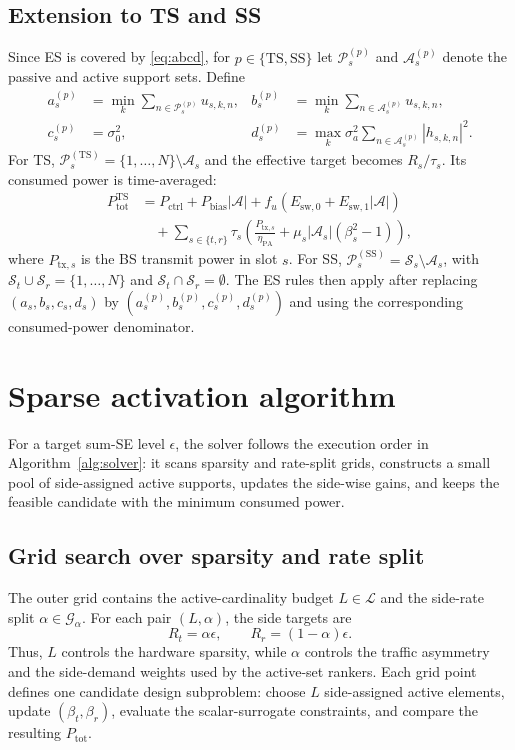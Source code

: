 \documentclass[journal]{IEEEtran}
\begin{document}
\subsection{Extension to TS and SS}
Since ES is covered by \eqref{eq:abcd}, for $p\in\{\mathrm{TS},\mathrm{SS}\}$ let $\mathcal{P}_s^{(p)}$ and $\mathcal{A}_s^{(p)}$ denote the passive and active support sets. Define
\begin{align*}
a_s^{(p)} &= \min_k \sum_{n\in\mathcal{P}_s^{(p)}} u_{s,k,n}, &
 b_s^{(p)} &= \min_k \sum_{n\in\mathcal{A}_s^{(p)}} u_{s,k,n},\\
c_s^{(p)} &= \sigma_0^2, &
d_s^{(p)} &= \max_k \sigma_a^2 \sum_{n\in\mathcal{A}_s^{(p)}} |h_{s,k,n}|^2.
\end{align*}
For TS, $\mathcal{P}_s^{(\mathrm{TS})}=\{1,\ldots,N\}\setminus\mathcal{A}_s$ and the effective target becomes $R_s/\tau_s$. Its consumed power is time-averaged:
\begin{equation}
\begin{aligned}
P_{\mathrm{tot}}^{\mathrm{TS}}
&=P_{\mathrm{ctrl}}+P_{\mathrm{bias}}|\mathcal{A}|
+f_u\!\left(E_{\mathrm{sw},0}+E_{\mathrm{sw},1}|\mathcal{A}|\right) \\
&\quad +\sum_{s\in\{t,r\}}\tau_s\!\left(\frac{P_{\mathrm{tx},s}}{\eta_{\mathrm{PA}}}
+\mu_s|\mathcal{A}_s|(\beta_s^2-1)\right),
\end{aligned}
\label{eq:ts_power}
\end{equation}
where $P_{\mathrm{tx},s}$ is the BS transmit power in slot $s$. For SS, $\mathcal{P}_s^{(\mathrm{SS})}=\mathcal{S}_s\setminus\mathcal{A}_s$, with $\mathcal{S}_t\cup\mathcal{S}_r=\{1,\ldots,N\}$ and $\mathcal{S}_t\cap\mathcal{S}_r=\emptyset$. The ES rules then apply after replacing $(a_s,b_s,c_s,d_s)$ by $(a_s^{(p)},b_s^{(p)},c_s^{(p)},d_s^{(p)})$ and using the corresponding consumed-power denominator.

\section{Sparse activation algorithm}
For a target sum-SE level $\epsilon$, the solver follows the execution order in Algorithm~\ref{alg:solver}: it scans sparsity and rate-split grids, constructs a small pool of side-assigned active supports, updates the side-wise gains, and keeps the feasible candidate with the minimum consumed power.

\subsection{Grid search over sparsity and rate split}
The outer grid contains the active-cardinality budget $L\in\mathcal{L}$ and the side-rate split $\alpha\in\mathcal{G}_{\alpha}$. For each pair $(L,\alpha)$, the side targets are
\[
R_t=\alpha\epsilon,\qquad R_r=(1-\alpha)\epsilon.
\]
Thus, $L$ controls the hardware sparsity, while $\alpha$ controls the traffic asymmetry and the side-demand weights used by the active-set rankers. Each grid point defines one candidate design subproblem: choose $L$ side-assigned active elements, update $(\beta_t,\beta_r)$, evaluate the scalar-surrogate constraints, and compare the resulting $P_{\mathrm{tot}}$.
\end{document}
